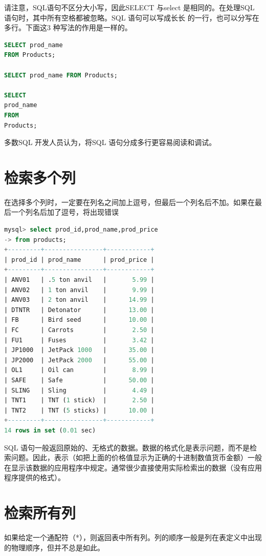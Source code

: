 \documentclass[11pt,a4paper,oneside]{book}
\begin{document}
请注意，SQL语句不区分大小写，因此SELECT 与select 是相同的。在处理SQL 语句时，其中所有空格都被忽略。SQL 语句可以写成长长
的一行，也可以分写在多行。下面这3 种写法的作用是一样的。
\begin{lstlisting}[language=sql]
SELECT prod_name
FROM Products;

SELECT prod_name FROM Products;

SELECT
prod_name
FROM
Products;	
\end{lstlisting}
多数SQL 开发人员认为，将SQL 语句分成多行更容易阅读和调试。

\section{检索多个列}
在选择多个列时，一定要在列名之间加上逗号，但最后一个列名后不加。如果在最后一个列名后加了逗号，将出现错误
\begin{lstlisting}[language=sql]
mysql> select prod_id,prod_name,prod_price
-> from products;
+---------+----------------+------------+
| prod_id | prod_name      | prod_price |
+---------+----------------+------------+
| ANV01   | .5 ton anvil   |       5.99 |
| ANV02   | 1 ton anvil    |       9.99 |
| ANV03   | 2 ton anvil    |      14.99 |
| DTNTR   | Detonator      |      13.00 |
| FB      | Bird seed      |      10.00 |
| FC      | Carrots        |       2.50 |
| FU1     | Fuses          |       3.42 |
| JP1000  | JetPack 1000   |      35.00 |
| JP2000  | JetPack 2000   |      55.00 |
| OL1     | Oil can        |       8.99 |
| SAFE    | Safe           |      50.00 |
| SLING   | Sling          |       4.49 |
| TNT1    | TNT (1 stick)  |       2.50 |
| TNT2    | TNT (5 sticks) |      10.00 |
+---------+----------------+------------+
14 rows in set (0.01 sec)
\end{lstlisting}
SQL 语句一般返回原始的、无格式的数据。数据的格式化是表示问题，而不是检索问题。因此，表示（如把上面的价格值显示为正确的十进制数值货币金额）一般在显示该数据的应用程序中规定。通常很少直接使用实际检索出的数据（没有应用程序提供的格式）。

\section{检索所有列}
如果给定一个通配符（*），则返回表中所有列。列的顺序一般是列在表定义中出现的物理顺序，但并不总是如此。
\end{document}
